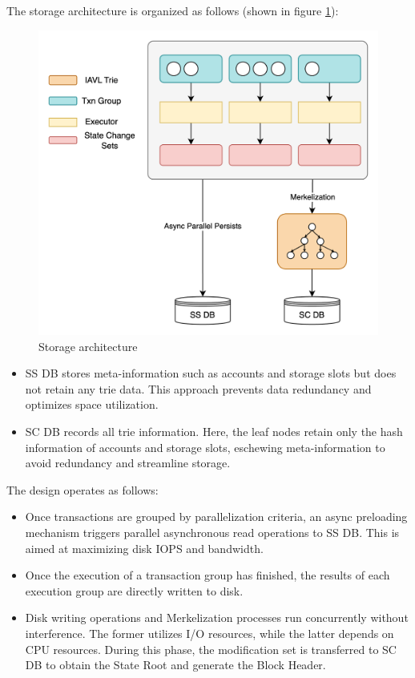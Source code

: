The storage architecture is organized as follows (shown in figure \ref{fig:sc_ss_separation}):

\begin{figure}[htp]
    \centering
    \includegraphics[width=\columnwidth]{sections/images/sc-ss-separation.png}
    \caption{Storage architecture}
    \label{fig:sc_ss_separation}
\end{figure}

\begin{itemize}
    \item SS DB stores meta-information such as accounts and storage slots but does not retain any trie data. This approach prevents data redundancy and optimizes space utilization.
    \item SC DB records all trie information. Here, the leaf nodes retain only the hash information of accounts and storage slots, eschewing meta-information to avoid redundancy and streamline storage.
\end{itemize}

The design operates as follows:

\begin{itemize}
    \item Once transactions are grouped by parallelization criteria, an async preloading mechanism triggers parallel asynchronous read operations to SS DB. This is aimed at maximizing disk IOPS and bandwidth.
    \item Once the execution of a transaction group has finished, the results of each execution group are directly written to disk.
    \item Disk writing operations and Merkelization processes run concurrently without interference. The former utilizes I/O resources, while the latter depends on CPU resources. During this phase, the modification set is transferred to SC DB to obtain the State Root and generate the Block Header.
\end{itemize}

